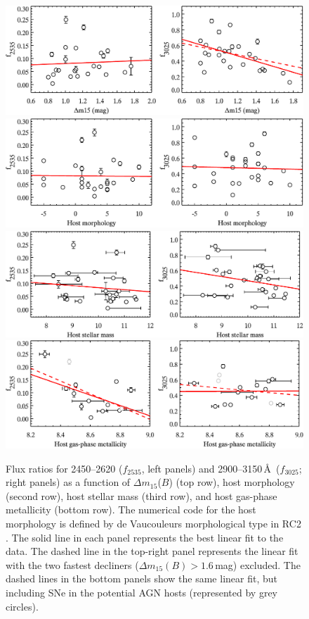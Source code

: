 \documentclass[useAMS,usenatbib]{mn2e}
\newcommand{\deltam}{\ensuremath{\Delta m_{15}}}
\begin{document}
\begin{figure}
	\centering
		\includegraphics[scale=0.74]{plot/ratio_uv_dm15.pdf}\\
		\vspace{0.1cm}
		\includegraphics[scale=0.74]{plot/ratio_uv_morph.pdf}\\
		\vspace{0.1cm}
		\includegraphics[scale=0.74]{plot/ratio_uv_mass.pdf}\\
		\vspace{0.1cm}
		\includegraphics[scale=0.74]{plot/ratio_uv_metal.pdf}
                \caption{Flux ratios for 2450--2620 ($f_{2535}$, left panels) and 2900--3150\,\AA\ ($f_{3025}$; right panels) as a function of $\deltam$($B$) (top row), host morphology (second row), host stellar mass (third row), and host gas-phase metallicity (bottom row). The numerical code for the host morphology is defined by de Vaucouleurs morphological type in RC2 \citep{1976RC2...C......0D}. The solid line in each panel represents the best linear fit to the data. The dashed line in the top-right panel represents the linear fit with the two fastest decliners ($\deltam(B)>1.6$\,mag) excluded. The dashed lines in the bottom panels show the same linear fit, but including SNe in the potential AGN hosts (represented by grey circles).}

\end{figure}
\end{document}

